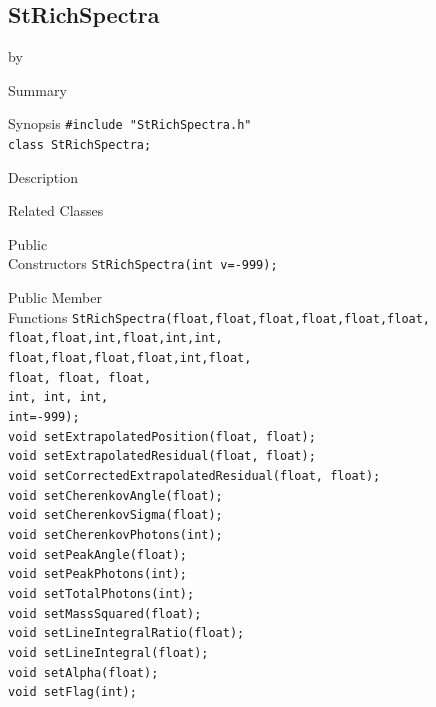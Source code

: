 \documentclass[twoside]{article}
\newcommand{\entrylabel}[1]{\mbox{\textbf{{#1}}}\hfil}%
\newenvironment{entry}
{\begin{list}{}%
    {\renewcommand{\makelabel}{\entrylabel}%
     \setlength{\labelwidth}{90pt}%
     \setlength{\leftmargin}{\labelwidth}
     \advance\leftmargin by \labelsep%
      }%
    }%
  {\end{list}}
\newcommand{\Entrylabel}[1]%
{\raisebox{0pt}[1ex][0pt]{\makebox[\labelwidth][l]%
    {\parbox[t]{\labelwidth}{\hspace{0pt}\textbf{{#1}}}}}}
\newenvironment{Entry}%
{\renewcommand{\entrylabel}{\Entrylabel}\begin{entry}}%
  {\end{entry}}
\begin{document}
\subsection{StRichSpectra}
\label{sec:StRichSpectra}
\begin{Entry}
\item[Summary]
\item[Synopsis]
    \verb+#include "StRichSpectra.h"+\\
    \verb+class StRichSpectra;+\\
\item[Description]
\item[Related Classes]
\item[Public\\ Constructors]
    \verb+StRichSpectra(int v=-999);+\\
\item[Public Member\\ Functions]
    \verb+StRichSpectra(float,float,float,float,float,float,+\\
    \verb+float,float,int,float,int,int,+\\
    \verb+float,float,float,float,int,float,+\\
    \verb+float, float, float,+\\
    \verb+int, int, int,+\\
    \verb+int=-999);+\\
    \verb+void setExtrapolatedPosition(float, float);+\\
    \verb+void setExtrapolatedResidual(float, float);+\\
    \verb+void setCorrectedExtrapolatedResidual(float, float);+\\
    \verb+void setCherenkovAngle(float);+\\
    \verb+void setCherenkovSigma(float);+\\
    \verb+void setCherenkovPhotons(int);+\\
    \verb+void setPeakAngle(float);+\\
    \verb+void setPeakPhotons(int);+\\
    \verb+void setTotalPhotons(int);+\\
    \verb+void setMassSquared(float);+\\
    \verb+void setLineIntegralRatio(float);+\\
    \verb+void setLineIntegral(float);+\\
    \verb+void setAlpha(float);+\\
    \verb+void setFlag(int);+\\

\end{Entry}
\end{document}
